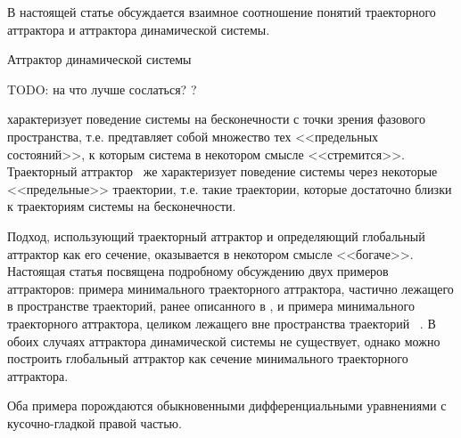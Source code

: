 \documentclass[a4paper]{article} %
\begin{document}
%

В настоящей статье обсуждается взаимное соотношение понятий траекторного аттрактора и аттрактора динамической системы.

Аттрактор динамической системы

TODO: на что лучше сослаться? \cite{Vishik} ?

характеризует поведение системы на бесконечности с точки зрения фазового пространства,
т.е. предтавляет собой множество тех <<предельных состояний>>, к которым система в некотором смысле <<стремится>>.
Траекторный аттрактор~\cite{Vorotnikov,Kondratyev} же характеризует поведение системы
через некоторые <<предельные>> траектории, т.е. такие траектории,
которые достаточно близки к траекториям системы на бесконечности.

Подход, использующий траекторный аттрактор и определяющий глобальный аттрактор как его сечение,
оказывается в некотором смысле <<богаче>>.
Настоящая статья посвящена подробному обсуждению двух примеров аттракторов:
примера минимального траекторного аттрактора,
частично лежащего в пространстве траекторий, ранее описанного в \cite{Zelenaya},
и примера минимального траекторного аттрактора, целиком лежащего вне пространства траекторий
~\cite{mzmZvAv,vvmshZvAv}.
В обоих случаях аттрактора динамической системы не существует,
однако можно построить глобальный аттрактор как сечение минимального траекторного аттрактора.

Оба примера порождаются обыкновенными дифференциальными уравнениями с кусочно-гладкой правой частью.


%

\end{document}
